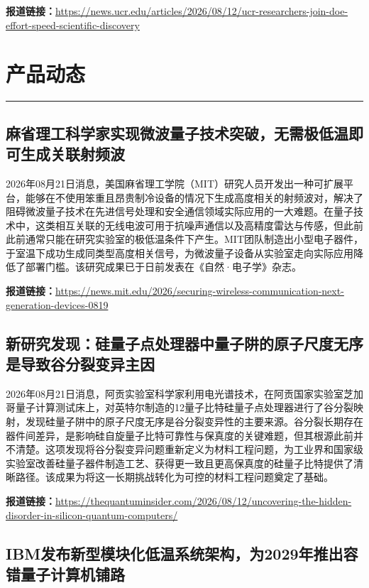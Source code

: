 \documentclass[12pt,a4paper]{ctexart}
\begin{document}
\noindent\textbf{报道链接：}\url{https://news.ucr.edu/articles/2026/08/12/ucr-researchers-join-doe-effort-speed-scientific-discovery}


\newpage
\section{产品动态}
\vspace{-0.5em}
\noindent\rule{\linewidth}{1.5pt}

\subsection{ 麻省理工科学家实现微波量子技术突破，无需极低温即可生成关联射频波 }

2026年08月21日消息，美国麻省理工学院（MIT）研究人员开发出一种可扩展平台，能够在不使用笨重且昂贵制冷设备的情况下生成高度相关的射频波对，解决了阻碍微波量子技术在先进信号处理和安全通信领域实际应用的一大难题。在量子技术中，这类相互关联的无线电波可用于抗噪声通信以及高精度雷达与传感，但此前此前通常只能在研究实验室的极低温条件下产生。MIT团队制造出小型电子器件，于室温下成功生成同类型高度相关信号，为微波量子设备从实验室走向实际应用降低了部署门槛。该研究成果已于日前发表在《自然·电子学》杂志。

\noindent\textbf{报道链接：}\url{https://news.mit.edu/2026/securing-wireless-communication-next-generation-devices-0819}

\subsection{ 新研究发现：硅量子点处理器中量子阱的原子尺度无序是导致谷分裂变异主因 }

2026年08月21日消息，阿贡实验室科学家利用电光谱技术，在阿贡国家实验室芝加哥量子计算测试床上，对英特尔制造的12量子比特硅量子点处理器进行了谷分裂映射，发现硅量子阱中的原子尺度无序是谷分裂变异性的主要来源。谷分裂长期存在器件间差异，是影响硅自旋量子比特可靠性与保真度的关键难题，但其根源此前并不清楚。这项发现将谷分裂变异问题重新定义为材料工程问题，为工业界和国家级实验室改善硅量子器件制造工艺、获得更一致且更高保真度的硅量子比特提供了清晰路径。该成果为将这一长期挑战转化为可控的材料工程问题奠定了基础。

\noindent\textbf{报道链接：}\url{https://thequantuminsider.com/2026/08/12/uncovering-the-hidden-disorder-in-silicon-quantum-computers/}

\subsection{ IBM发布新型模块化低温系统架构，为2029年推出容错量子计算机铺路 }
\end{document}
